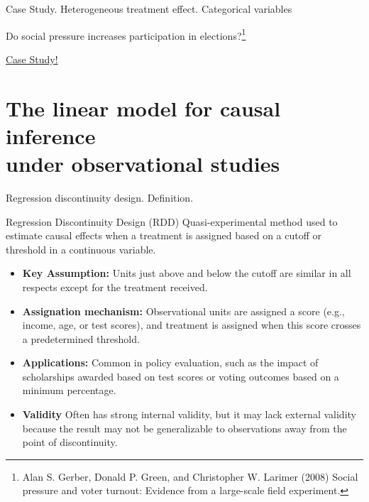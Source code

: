 \documentclass[aspectratio=169]{beamer}
\begin{document}
\begin{frame}{Case Study. Heterogeneous treatment effect. Categorical variables}

    \begin{center}
        Do social pressure increases participation in elections?\footnote{\scriptsize Alan S. Gerber, Donald P. Green, and Christopher W. Larimer (2008) Social pressure and voter turnout: Evidence from a large-scale field experiment.}
        \vspace{1cm}

        {\Large \href{url}{Case Study!}}
    \end{center}
    
\end{frame}

\section{\Large The linear model for causal inference \\ under observational studies}

\begin{frame}{Regression discontinuity design. Definition.}

\begin{coolblock}{Regression Discontinuity Design (RDD)}
    Quasi-experimental method used to estimate causal effects when a treatment is assigned based on a cutoff or threshold in a continuous variable.
\end{coolblock}

\begin{itemize}
    \item \textbf{Key Assumption:} Units just above and below the cutoff are similar in all respects except for the treatment received.
    \item \textbf{Assignation mechanism:} Observational units are assigned a score (e.g., income, age, or test scores), and treatment is assigned when this score crosses a predetermined threshold.
    \item \textbf{Applications:} Common in policy evaluation, such as the impact of scholarships awarded based on test scores or voting outcomes based on a minimum percentage.
    \item \textbf{Validity} Often has strong internal validity, but it may lack external validity because the result may not be generalizable to observations away from the point of discontinuity.
\end{itemize}
    
\end{frame}
\end{document}
